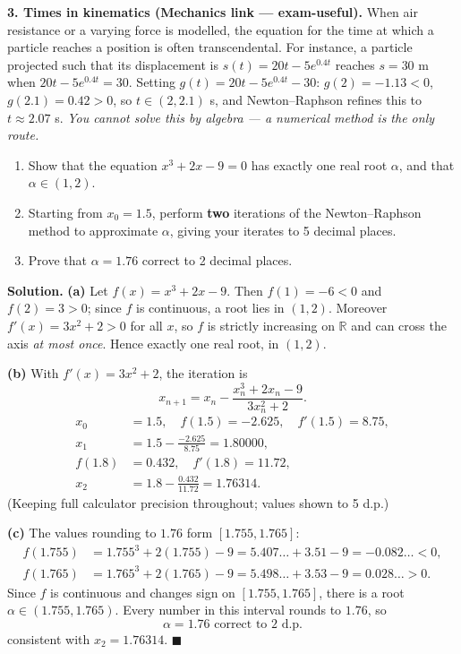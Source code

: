 \documentclass[11pt]{article}
\newcounter{popsec}
\newcounter{popsub}
\newcommand{\courssub}[1]{%
  \stepcounter{popsub}%
  \par\vspace{9pt}\noindent{\popxbold\fontsize{11.5}{13}\selectfont\color{popink}{\color{poporange}\thepopsec.\thepopsub}\hspace{6pt}#1}\par\nopagebreak\vspace{4pt}
}
\begin{document}
\textbf{3. Times in kinematics (Mechanics link — exam-useful).} When air resistance or a varying force is modelled, the equation for the time at which a particle reaches a position is often transcendental. For instance, a particle projected such that its displacement is $s(t) = 20t - 5e^{0.4t}$ reaches $s = 30$ m when $20t - 5e^{0.4t} = 30$. Setting $g(t) = 20t - 5e^{0.4t} - 30$: $g(2) = -1.13 < 0$, $g(2.1) = 0.42 > 0$, so $t \in (2, 2.1)$ s, and Newton--Raphson refines this to $t \approx 2.07$ s. \emph{You cannot solve this by algebra — a numerical method is the only route.}

\courssub{Synthesis: a full GCE-style problem}

\begin{exoresolu}
\begin{enumerate}
\item[(a)] Show that the equation $x^3 + 2x - 9 = 0$ has exactly one real root $\alpha$, and that $\alpha \in (1, 2)$.
\item[(b)] Starting from $x_0 = 1.5$, perform \textbf{two} iterations of the Newton--Raphson method to approximate $\alpha$, giving your iterates to 5 decimal places.
\item[(c)] Prove that $\alpha = 1.76$ correct to 2 decimal places.
\end{enumerate}
\tcblower
\textbf{Solution.}
\textbf{(a)} Let $f(x) = x^3 + 2x - 9$. Then $f(1) = -6 < 0$ and $f(2) = 3 > 0$; since $f$ is continuous, a root lies in $(1,2)$. Moreover $f'(x) = 3x^2 + 2 > 0$ for all $x$, so $f$ is strictly increasing on $\mathbb{R}$ and can cross the axis \emph{at most once}. Hence exactly one real root, in $(1,2)$.

\textbf{(b)} With $f'(x) = 3x^2 + 2$, the iteration is
\[ x_{n+1} = x_n - \frac{x_n^3 + 2x_n - 9}{3x_n^2 + 2}. \]
\begin{align*}
x_0 &= 1.5, \quad f(1.5) = -2.625, \quad f'(1.5) = 8.75,\\
x_1 &= 1.5 - \frac{-2.625}{8.75} = 1.80000,\\
f(1.8) &= 0.432, \quad f'(1.8) = 11.72,\\
x_2 &= 1.8 - \frac{0.432}{11.72} = 1.76314.
\end{align*}
(Keeping full calculator precision throughout; values shown to 5 d.p.)

\textbf{(c)} The values rounding to $1.76$ form $[1.755, 1.765]$:
\begin{align*}
f(1.755) &= 1.755^3 + 2(1.755) - 9 = 5.407\ldots + 3.51 - 9 = -0.082\ldots < 0,\\
f(1.765) &= 1.765^3 + 2(1.765) - 9 = 5.498\ldots + 3.53 - 9 = 0.028\ldots > 0.
\end{align*}
Since $f$ is continuous and changes sign on $[1.755, 1.765]$, there is a root $\alpha \in (1.755, 1.765)$. Every number in this interval rounds to $1.76$, so
\[ \boxed{\alpha = 1.76 \text{ correct to 2 d.p.}} \]
consistent with $x_2 = 1.76314$. \hfill $\blacksquare$
\end{exoresolu}
\end{document}
